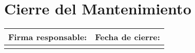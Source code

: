 \documentclass[10pt,a4paper]{article}
\begin{document}
\vspace{0.08cm}

\section*{\color{darkblue}Cierre del Mantenimiento}
\begin{tabular}{|>{}P{0.45\textwidth}|>{}P{0.45\textwidth}|}
\hline
    \textbf{Firma responsable:} & \textbf{Fecha de cierre:} \\[12pt]
\hline
 & \\[20pt]
\hline
\end{tabular}

\vspace{0.08cm}

\\[4pt]
\begin{tabular}{|>{}P{0.92\textwidth}|}
\hline
\rule{0pt}{3.5cm}\\
\hline
\end{tabular}
\end{document}

